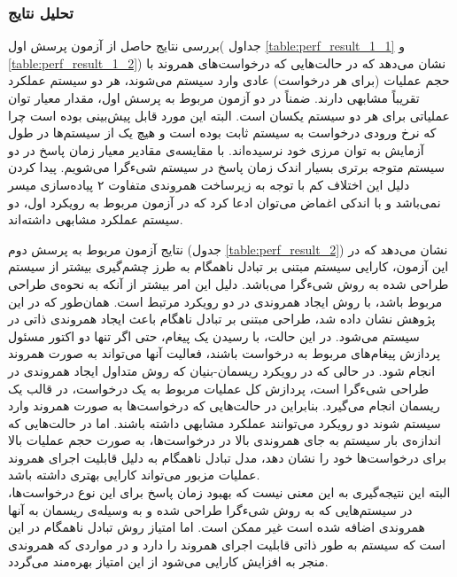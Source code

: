 \subsubsection{تحلیل نتایج}
بررسی نتایج حاصل از آزمون پرسش اول( جداول \ref{table:perf_result_1_1}  و \ref{table:perf_result_1_2}) نشان می‌دهد که در حالت‌هایی که درخواست‌های همروند با حجم عملیات (برای هر درخواست) عادی وارد سیستم می‌شوند، هر دو سیستم عملکرد تقریباً مشابهی دارند. ضمناً  در دو آزمون مربوط به پرسش اول، مقدار معیار توان عملیاتی برای هر دو سیستم یکسان است. البته این مورد قابل پیش‌بینی بوده است چرا که نرخ ورودی درخواست به سیستم ثابت بوده است و هیچ‌ یک از سیستم‌ها در طول آزمایش به توان مرزی خود نرسیده‌اند. با مقایسه‌ی مقادیر معیار زمان پاسخ در دو سیستم متوجه برتری بسیار اندک زمان پاسخ در سیستم شیءگرا می‌شویم. پیدا کردن دلیل این اختلاف کم با توجه به زیرساخت همروندی متفاوت ۲ پیاده‌سازی میسر نمی‌باشد و با اندکی اغماض می‌توان ادعا کرد که در آزمون مربوط به رویکرد اول، دو سیستم عملکرد مشابهی داشته‌اند. 

نتایج آزمون مربوط به پرسش دوم (جدول \ref{table:perf_result_2}) نشان می‌دهد که در این آزمون، کارایی سیستم مبتنی بر تبادل ناهمگام به طرز چشم‌گیری بیشتر از سیستم طراحی شده به روش شیءگرا می‌باشد. دلیل این امر بیشتر از آنکه به نحوه‌ی طراحی مربوط باشد، با روش ایجاد همروندی در دو رویکرد مرتبط است. همان‌طور که در این پژوهش نشان داده شد، طراحی مبتنی بر تبادل ناهگام باعث ایجاد همروندی ذاتی در سیستم می‌شود. در این حالت، با رسیدن یک پیغام، حتی اگر تنها دو اکتور مسئول پردازش پیغام‌های مربوط به درخواست باشند، فعالیت آنها می‌تواند به صورت همروند انجام شود. در حالی که در رویکرد ریسمان-بنیان که روش متداول ایجاد همروندی در طراحی شیءگرا است، پردازش کل عملیات مربوط به یک درخواست، در قالب یک ریسمان انجام می‌گیرد. بنابراین در حالت‌هایی که درخواست‌ها به صورت همروند وارد سیستم شوند دو رویکرد می‌توانند عملکرد مشابهی داشته باشند. اما در حالت‌هایی که اندازه‌ی بار سیستم به جای همروندی بالا در درخواست‌ها، به صورت حجم عملیات بالا برای درخواست‌ها خود را نشان دهد، مدل تبادل ناهمگام به دلیل قابلیت اجرای همروند عملیات مزبور می‌تواند کارایی بهتری داشته باشد.\\ 
البته این نتیجه‌گیری به این معنی نیست که بهبود زمان پاسخ برای این نوع درخواست‌ها، در سیستم‌هایی که به روش شیءگرا طراحی شده و به وسیله‌ی ریسمان‌ به آنها همروندی اضافه شده است غیر ممکن است. اما امتیاز روش تبادل ناهمگام در این است که سیستم به طور ذاتی قابلیت اجرای همروند را دارد و در مواردی که همروندی منجر به افزایش کارایی می‌شود از این امتیاز بهره‌مند می‌گردد.

